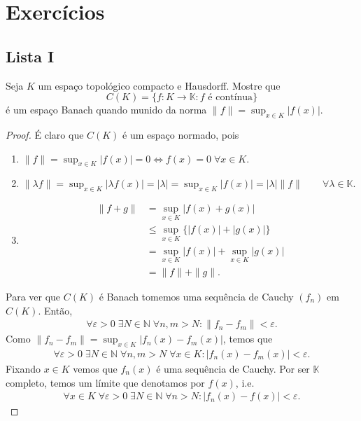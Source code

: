 \documentclass[portuguese]{article}
\theoremstyle{definition}
\newcommand{\N}{\mathbb{N}}
\begin{document}
	\clearpage
	\iffalse
	\section{Exercícios}
	\subsection{Lista I}
	\begin{exer*}[1]\label{exer:1}
		Seja $K$ um espaço topológico compacto e Hausdorff. Mostre que
		\[C(K)=\{f:K\to\mathbb{K}:f\text{ é contínua}\}\]
		é um espaço Banach quando munido da norma $\| f\|=\sup_{x\in K}|f(x)|$.
	\end{exer*}
	\begin{proof}
		É claro que $C(K)$ é um espaço normado, pois
		\begin{enumerate}
			\item $\| f\|=\sup_{x\in K}|f(x)|=0\iff f(x)=0\;\forall x\in K$.
			\item $\| \lambda f\| =\sup_{x\in K}|\lambda f(x)|=|\lambda|=\sup_{x\in K}|f(x)|=|\lambda|\| f\|\qquad\forall\lambda\in\mathbb{K}$.
			\item
			\begin{align*}
				\| f+g\|&=\sup_{x\in K}|f(x)+g(x)|\\
				&\leq\sup_{x\in K}\{|f(x)|+|g(x)|\}\\
				&=\sup_{x\in K}|f(x)|+\sup_{x\in K}|g(x)|\\
				&=\| f\|+\| g\|.
			\end{align*}
		\end{enumerate}
		Para ver que $C(K)$ é Banach tomemos uma sequência de Cauchy $(f_n)$ em $C(K)$. Então,
		\begin{gather*}
			\forall\varepsilon>0\;\exists N\in\N\;\forall n,m>N:\| f_n-f_m\|<\varepsilon.
		\end{gather*}
		Como $\| f_n-f_m\|=\sup_{x\in K}|f_n(x)-f_m(x)|$, temos que
		\begin{gather*}
			\forall\varepsilon>0\;\exists N\in\N\;
			\forall n,m>N\;\forall x\in K:
			|f_n(x)-f_m(x)|<\varepsilon.
		\end{gather*}
		Fixando $x\in K$ vemos que $f_n(x)$ é uma sequência de Cauchy. Por ser $\mathbb{K}$ completo, temos um límite que denotamos por $f(x)$, i.e.
		\begin{equation}\label{eq:ex1.1}
			\begin{gathered}
				\forall x\in K\;\forall\varepsilon>0\;\exists N\in\N\;\forall
				n>N:|f_n(x)-f(x)|<\varepsilon.
			\end{gathered}

\end{equation}
\end{proof}
\end{document}
